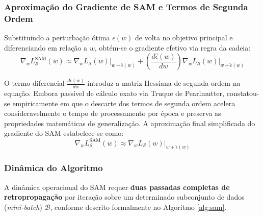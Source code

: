 \documentclass[12pt, a4paper]{article}
\begin{document}
\subsubsection{Aproximação do Gradiente de SAM e Termos de Segunda Ordem}
Substituindo a perturbação ótima $\hat{\epsilon}(w)$ de volta no objetivo principal e diferenciando em relação a $w$, obtém-se o gradiente efetivo via regra da cadeia:
\begin{equation}
\nabla_w L_{\mathcal{S}}^{\text{SAM}}(w) \approx \nabla_w L_{\mathcal{S}}(w)\big|_{w + \hat{\epsilon}(w)} + \left( \frac{d\hat{\epsilon}(w)}{dw} \right) \nabla_w L_{\mathcal{S}}(w)\big|_{w + \hat{\epsilon}(w)}
\end{equation}

O termo diferencial $\frac{d\hat{\epsilon}(w)}{dw}$ introduz a matriz Hessiana de segunda ordem na equação. Embora passível de cálculo exato via Truque de Pearlmutter, constatou-se empiricamente em \cite{SAM} que o descarte dos termos de segunda ordem acelera consideravelmente o tempo de processamento por época e preserva as propriedades matemáticas de generalização. A aproximação final simplificada do gradiente do SAM estabelece-se como:
\begin{equation}
\nabla_w L_{\mathcal{S}}^{\text{SAM}}(w) \approx \nabla_w L_{\mathcal{S}}(w)\big|_{w + \hat{\epsilon}(w)}
\end{equation}

\subsubsection{Dinâmica do Algoritmo}
A dinâmica operacional do SAM requer \textbf{duas passadas completas de retropropagação} por iteração sobre um determinado subconjunto de dados (\textit{mini-batch}) $\mathcal{B}$, conforme descrito formalmente no Algoritmo \ref{alg:sam}.

\begin{algorithm}[H]
\DontPrintSemicolon
{}
\BlankLine
{}
\;
\caption{Algoritmo Sharpness-Aware Minimization (SAM)}
\label{alg:sam}
\end{algorithm}
\end{document}
